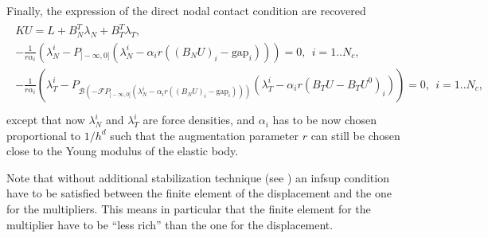\documentclass[a4paper,11pt,english]{sphinxmanual}
\begin{document}
Finally, the expression of the direct nodal contact condition are recovered
\begin{align*}\!\begin{aligned}
K U = L + B_N^T \lambda_N + B_T^T \lambda_T,\\
-\frac{1}{r\alpha_i}(\lambda_N^i - P_{]-\infty, 0]}(\lambda_N^i - \alpha_i r ((B_N U)_i - \text{gap}_i))) = 0, ~~ i = 1..N_c,\\
-\frac{1}{r\alpha_i}(\lambda_T^i - P_{{\mathscr B}(-{\mathscr F}P_{]-\infty, 0]}(\lambda_N^i - \alpha_i r ((B_N U)_i - \text{gap}_i)))}(\lambda_T^i - \alpha_i r (B_T U - B_T U^{0})_i)) = 0, ~~ i = 1..N_c,\\
\end{aligned}\end{align*}
except that now \(\lambda_N^i\) and \(\lambda_T^i\) are force densities, and \(\alpha_i\) has to be now chosen proportional to \(1/h^d\) such that the augmentation parameter \(r\) can still be chosen close to the Young modulus of the elastic body.

Note that without additional stabilization technique (see ) an inf\sphinxhyphen{}sup condition have to be satisfied between the finite element of the displacement and the one for the multipliers. This means in particular that the finite element for the multiplier have to be “less rich” than the one for the displacement.
\end{document}
